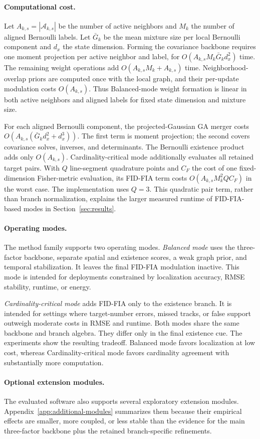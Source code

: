 \paragraph{Computational cost.}
Let $A_{k,s}=|\mathcal{A}_{k,s}|$ be the number of active neighbors and $M_k$ the number of aligned Bernoulli labels. Let $\bar G_k$ be the mean mixture size per local Bernoulli component and $d_x$ the state dimension. Forming the covariance backbone requires one moment projection per active neighbor and label, for $O(A_{k,s}M_k\bar G_k d_x^2)$ time. The remaining weight operations add $O(A_{k,s}M_k+A_{k,s})$ time. Neighborhood-overlap priors are computed once with the local graph, and their per-update modulation costs $O(A_{k,s})$. Thus Balanced-mode weight formation is linear in both active neighbors and aligned labels for fixed state dimension and mixture size.

For each aligned Bernoulli component, the projected-Gaussian GA merger costs $O\!\left(A_{k,s}(\bar G_k d_x^2+d_x^3)\right)$. The first term is moment projection; the second covers covariance solves, inverses, and determinants. The Bernoulli existence product adds only $O(A_{k,s})$. Cardinality-critical mode additionally evaluates all retained target pairs. With $Q$ line-segment quadrature points and $C_F$ the cost of one fixed-dimension Fisher-metric evaluation, its FID-FIA term costs $O(A_{k,s}M_k^2 Q C_F)$ in the worst case. The implementation uses $Q=3$. This quadratic pair term, rather than branch normalization, explains the larger measured runtime of FID-FIA-based modes in Section~\ref{sec:results}.

\paragraph{Operating modes.}

The method family supports two operating modes. \emph{Balanced mode} uses the three-factor backbone, separate spatial and existence scores, a weak graph prior, and temporal stabilization. It leaves the final FID-FIA modulation inactive. This mode is intended for deployments constrained by localization accuracy, RMSE stability, runtime, or energy.

\emph{Cardinality-critical mode} adds FID-FIA only to the existence branch. It is intended for settings where target-number errors, missed tracks, or false support outweigh moderate costs in RMSE and runtime. Both modes share the same backbone and branch algebra. They differ only in the final existence cue. The experiments show the resulting tradeoff. Balanced mode favors localization at low cost, whereas Cardinality-critical mode favors cardinality agreement with substantially more computation.

\paragraph{Optional extension modules.}

The evaluated software also supports several exploratory extension modules. Appendix~\ref{app:additional-modules} summarizes them because their empirical effects are smaller, more coupled, or less stable than the evidence for the main three-factor backbone plus the retained branch-specific refinements.
